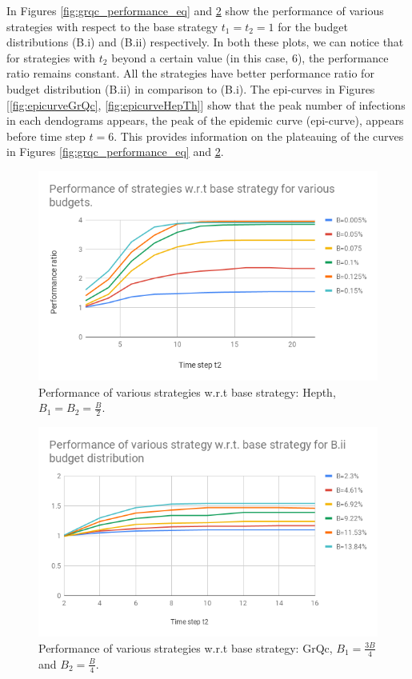 In Figures \ref{fig:grqc_performance_eq} and \ref{fig:grqc_performance_neq} show the performance of various strategies with respect to the base strategy $t_1 = t_2 = 1$ for the budget distributions (B.i) and (B.ii) respectively. In both these plots, we can notice that for strategies with $t_2$ beyond a certain value (in this case, 6), the performance ratio remains constant. All the strategies have better performance ratio for budget distribution (B.ii) in comparison to (B.i). The epi-curves in Figures [\ref{fig:epicurveGrQc}, \ref{fig:epicurveHepTh}] show that the peak number of infections in each dendograms appears, the peak of the epidemic curve (epi-curve), appears before time step $t = 6$. This provides information on the plateauing of the curves in Figures \ref{fig:grqc_performance_eq} and \ref{fig:grqc_performance_neq}.


\begin{figure}[!h]
    \centering
    \includegraphics[scale = 0.5]{figures/perf_hepth_eq.png}
    \caption{Performance of various strategies w.r.t base strategy: Hepth, $B_1 = B_2 = \frac{B}{2}$.}
    \label{fig:hepth_performance_eq}
\end{figure}

\begin{figure}[!h]
    \centering
    \includegraphics[scale = 0.5]{figures/perf_grqc_neq.png}
    \caption{Performance of various strategies w.r.t base strategy: GrQc, $B_1 = \frac{3B}{4}$ and $B_2 = \frac{B}{4}$.}
    \label{fig:grqc_performance_neq}
\end{figure}


